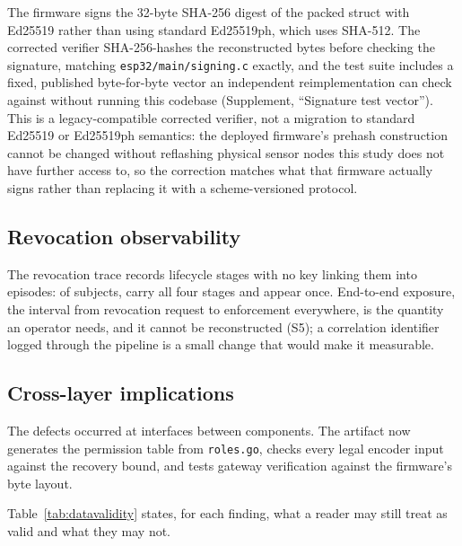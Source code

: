 \documentclass[a4paper,fleqn]{cas-dc}
\begin{document}
The firmware signs the 32-byte SHA-256 digest of the packed struct with
Ed25519 rather than using standard Ed25519ph, which uses SHA-512.
The corrected verifier SHA-256-hashes the reconstructed bytes
before checking the signature, matching \texttt{esp32/main/signing.c}
exactly, and the test suite includes a fixed, published byte-for-byte
vector an independent reimplementation can check against without running
this codebase (Supplement, ``Signature test vector''). This is a
legacy-compatible corrected verifier, not a migration to standard
Ed25519 or Ed25519ph semantics: the deployed firmware's prehash
construction cannot be changed without reflashing physical sensor nodes
this study does not have further access to, so the correction matches
what that firmware actually signs rather than replacing it with a
scheme-versioned protocol.

\subsection{Revocation observability}
\label{subsec:pm_revocation}

The revocation trace records lifecycle stages with no key linking them
into episodes: of \RevSubjects{} subjects, \RevComplete{} carry all four
stages and \RevSingleStage{} appear once. End-to-end exposure, the
interval from revocation request to enforcement everywhere, is the
quantity an operator needs, and it cannot be reconstructed (S5); a
correlation identifier logged through the pipeline is a small change that
would make it measurable.

\subsection{Cross-layer implications}
\label{subsec:pm_pattern}

The defects occurred at interfaces between components. The artifact now
generates the permission table from \texttt{roles.go}, checks every legal
encoder input against the recovery bound, and tests gateway verification
against the firmware's byte layout.

Table~\ref{tab:datavalidity} states, for each finding, what a reader may
still treat as valid and what they may not.
\end{document}
